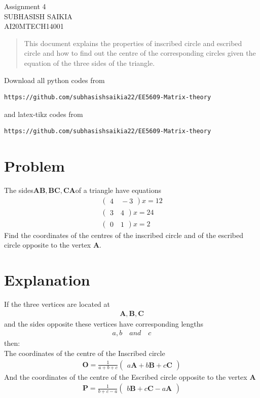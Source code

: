 \documentclass[journal,12pt,twocolumn]{IEEEtran}
\newcommand{\myvec}[1]{\ensuremath{\begin{pmatrix}#1\end{pmatrix}}}
\numberwithin{equation}{subsection}
\let\vec\mathbf
\begin{document}
\begin{center}
\huge Assignment 4\\
\large SUBHASISH SAIKIA\\
\large AI20MTECH14001\\
\end{center}
\vspace{0.5cm}
\begin{abstract}
This document explains the properties of inscribed circle and  escribed circle and how to find out the centre of the corresponding circles given the equation of the three sides of the triangle. 
\end{abstract}
\vspace{0.5cm}
Download all python codes from 
\begin{lstlisting}
https://github.com/subhasishsaikia22/EE5609-Matrix-theory
\end{lstlisting}
%
and latex-tikz codes from 
\begin{lstlisting}
https://github.com/subhasishsaikia22/EE5609-Matrix-theory
\end{lstlisting}
%
\vspace{0.5cm}
\section{Problem}
The sides$ \vec{AB},\vec{BC}, \vec{CA} $of a triangle have equations
\begin{align}
    \myvec{4\quad-3}x=12\\
    \myvec{3\quad4}x=24 \\ 
    \myvec{0\quad1}x=2
\end{align} 
Find the coordinates of the centres of the
inscribed circle and of the escribed circle opposite
to the vertex $\vec{A}$.

\section{Explanation}

If the three vertices are located at\begin{align}
     \vec{A},\vec{B},\vec{C}
\end{align} 
and the sides opposite these vertices have corresponding lengths \begin{align}
{a}, {b}\quad and\quad {c} 
\end{align} 
then:\\
 The coordinates of the centre of the Inscribed circle
 \begin{align}
 \vec{O}=\frac{1}{{a}+{b}+{c}}\myvec{{a}\vec{A}+{b} \vec{B}+{c}\vec{C}}
 \end{align} 
And the coordinates of the centre of the Escribed circle  opposite to the vertex $\vec{A}$
 \begin{align}
\vec{P}=\frac{1}{{b}+{c}-{a}}\myvec{ {b}\vec{B}+{c}\vec{C}-{a}\vec{A}}
 \end{align}
 
\end{document}
